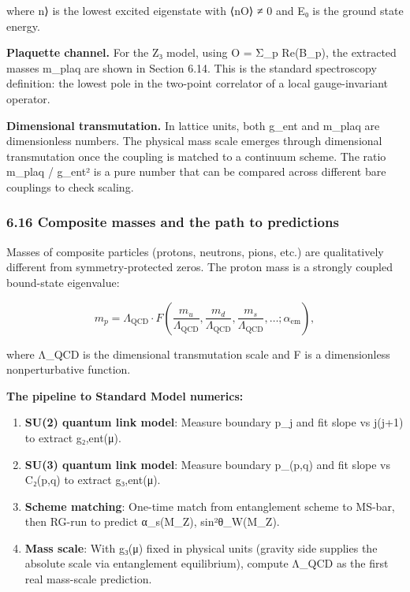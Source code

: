 where \textbar n⟩ is the lowest excited eigenstate with ⟨n\textbar O⟩ ≠ 0 and E₀ is the ground state energy.

\textbf{Plaquette channel.} For the Z₃ model, using O = Σ\_p Re(B\_p), the extracted masses m\_plaq are shown in Section 6.14. This is the standard spectroscopy definition: the lowest pole in the two-point correlator of a local gauge-invariant operator.

\textbf{Dimensional transmutation.} In lattice units, both g\_ent and m\_plaq are dimensionless numbers. The physical mass scale emerges through dimensional transmutation once the coupling is matched to a continuum scheme. The ratio m\_plaq / g\_ent² is a pure number that can be compared across different bare couplings to check scaling.

\subsubsection{6.16 Composite masses and the path to predictions}\label{616-composite-masses-and-the-path-to-predictions}

Masses of composite particles (protons, neutrons, pions, etc.) are qualitatively different from symmetry-protected zeros. The proton mass is a strongly coupled bound-state eigenvalue:

\[
m_p = \Lambda_{\mathrm{QCD}} \cdot F\left(\frac{m_u}{\Lambda_{\mathrm{QCD}}},
\frac{m_d}{\Lambda_{\mathrm{QCD}}}, \frac{m_s}{\Lambda_{\mathrm{QCD}}}, \ldots;
\alpha_{\mathrm{em}}\right),
\]

where Λ\_QCD is the dimensional transmutation scale and F is a dimensionless nonperturbative function.

\textbf{The pipeline to Standard Model numerics:}

\begin{enumerate}
\def\labelenumi{\arabic{enumi}.}
\item
  \textbf{SU(2) quantum link model}: Measure boundary p\_j and fit slope vs j(j+1) to extract g₂,ent(μ).
\item
  \textbf{SU(3) quantum link model}: Measure boundary p\_(p,q) and fit slope vs C₂(p,q) to extract g₃,ent(μ).
\item
  \textbf{Scheme matching}: One-time match from entanglement scheme to MS-bar, then RG-run to predict α\_s(M\_Z), sin²θ\_W(M\_Z).
\item
  \textbf{Mass scale}: With g₃(μ) fixed in physical units (gravity side supplies the absolute scale via entanglement equilibrium), compute Λ\_QCD as the first real mass-scale prediction.
\end{enumerate}

